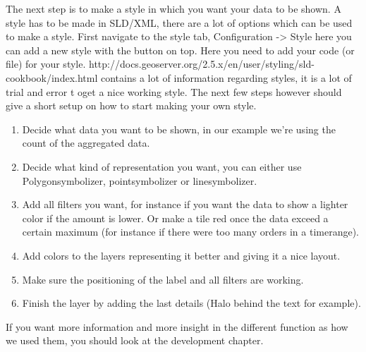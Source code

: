 The next step is to make a style in which you want your data to be shown. A style has to be made in SLD/XML, there are a lot of options which can be used to make a style. First navigate to the style tab, Configuration -> Style here you can add a new style with the button on top. Here you need to add your code (or file) for your style.
\newline
\newline http://docs.geoserver.org/2.5.x/en/user/styling/sld-cookbook/index.html contains a lot of information regarding styles, it is a lot of trial and error t oget a nice working style. The next few steps however should give a short setup on how to start making your own style.
\begin{enumerate}
	\item Decide what data you want to be shown, in our example we’re using the count of the aggregated data.
	\item Decide what kind of representation you want, you can either use Polygonsymbolizer, pointsymbolizer or linesymbolizer.
	\item Add all filters you want, for instance if you want the data to show a lighter color if the amount is lower. Or make a tile red once the data exceed a certain maximum (for instance if there were too many orders in a timerange).
	\item Add colors to the layers representing it better and giving it a nice layout.
	\item Make sure the positioning of the label and all filters are working.
	\item Finish the layer by adding the last details (Halo behind the text for example).
\end{enumerate}
	If you want more information and more insight in the different function as how we used them, you should look at the development chapter.